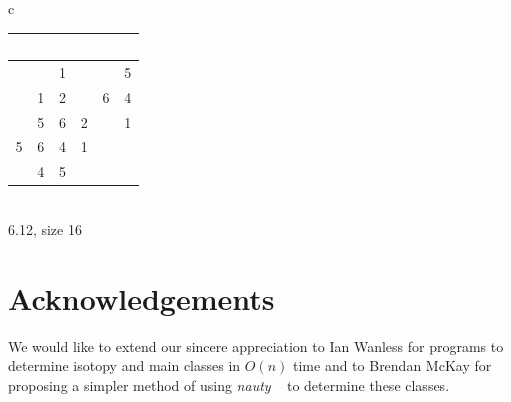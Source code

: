 \begin{center}
\begin{tabular}{c}
\begin{tabular}{|c|c|c|c|c|c|}
\hline $\;\;$ & $\;\;$ & $\;\;$ & $\;\;$ & $\;\;$ & $\;\;$ \\
\hline $\;\;$ & $\;\;$ & 1 & $\;\;$ & $\;\;$ & 5 \\
\hline $\;\;$ & 1 & 2 & $\;\;$ & 6 & 4 \\
\hline $\;\;$ & 5 & 6 & 2 & $\;\;$ & 1 \\
\hline 5 & 6 & 4 & 1 & $\;\;$ & $\;\;$ \\
\hline $\;\;$ & 4 & 5 & $\;\;$ & $\;\;$ & $\;\;$ \\
\hline 
\end{tabular}\\ 
6.12, size 16
\\
\end{tabular} 
\end{center} 


\section{Acknowledgements}
We would like to extend our sincere appreciation to Ian Wanless
for programs to determine isotopy and main classes in $O(n)$ time
and to Brendan McKay for proposing a simpler method of using
{\it nauty} ~\cite{nauty} to determine these classes.

